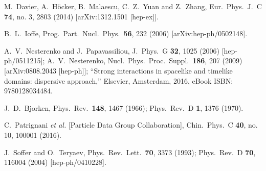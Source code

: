 \documentclass[3p,times,twocolumn]{elsarticle}
\begin{document}
\begin{thebibliography}{999}
  M.~Davier, A.~H\"ocker, B.~Malaescu, C.~Z.~Yuan and Z.~Zhang,
  Eur.\ Phys.\ J.\ C {\bf 74}, no. 3, 2803 (2014)
  [arXiv:1312.1501 [hep-ex]].
           
  B.~L.~Ioffe,
  Prog.\ Part.\ Nucl.\ Phys.\  {\bf 56}, 232 (2006)
  [arXiv:hep-ph/0502148].

A.~V.~Nesterenko and J.~Papavassiliou,
  J.\ Phys.\ G {\bf 32}, 1025 (2006)
  [hep-ph/0511215];
  A.~V.~Nesterenko,
  Nucl.\ Phys.\ Proc.\ Suppl.\  {\bf 186}, 207 (2009)
  [arXiv:0808.2043 [hep-ph]];
  ``Strong interactions in spacelike and timelike domains: dispersive approach,'' Elsevier, Amsterdam, 2016, eBook ISBN: 9780128034484.

  J.~D.~Bjorken,
  Phys.\ Rev.\  {\bf 148}, 1467 (1966);
  Phys.\ Rev.\ D {\bf 1}, 1376 (1970).

  C.~Patrignani {\it et al.} [Particle Data Group Collaboration],
  Chin.\ Phys.\ C {\bf 40}, no. 10, 100001 (2016).

  J.~Soffer and O.~Teryaev,
  Phys.\ Rev.\ Lett.\  {\bf 70}, 3373 (1993);
  Phys.\ Rev.\ D {\bf 70}, 116004 (2004)
  [hep-ph/0410228].
  

\end{thebibliography}
\end{document}
